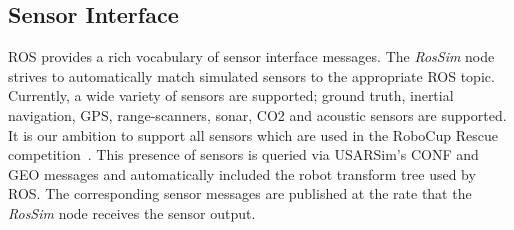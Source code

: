 \subsection*{Sensor Interface} 
ROS provides a rich vocabulary of sensor interface messages. The {\it RosSim} node strives to automatically match simulated sensors to the appropriate ROS topic. 
Currently, a wide variety of sensors are supported; ground truth, inertial navigation, GPS, range-scanners, sonar, CO2 and acoustic sensors are supported. 
It is our ambition to support all sensors which are used in the RoboCup Rescue competition~\cite{Akin2013}.
This presence of sensors is queried via USARSim's CONF and GEO messages and automatically included the robot transform tree used by ROS.
The corresponding sensor messages are published at the rate that the {\it RosSim} node receives the sensor output. 

